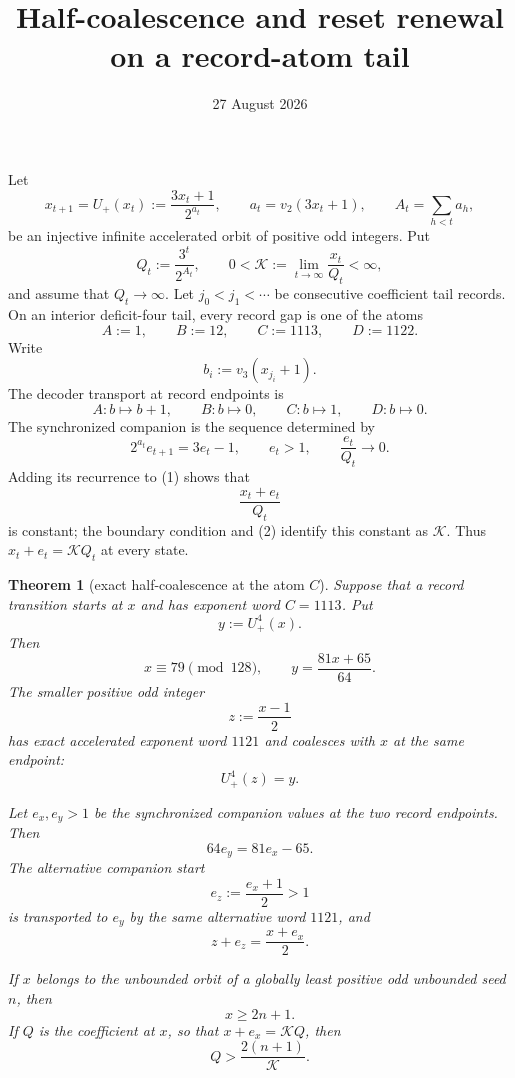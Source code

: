 \documentclass[11pt]{article}
\title{Half-coalescence and reset renewal on a record-atom tail}
\author{}
\date{27 August 2026}
\newtheorem{theorem}{Theorem}
\newcommand{\Up}{U_+}
\begin{document}
\maketitle

Let
\[
 x_{t+1}=\Up(x_t):=\frac{3x_t+1}{2^{a_t}},
 \qquad
 a_t=v_2(3x_t+1),
 \qquad
 A_t=\sum_{h<t}a_h,
 \tag{1}
\]
be an injective infinite accelerated orbit of positive odd integers.  Put
\[
 Q_t:=\frac{3^t}{2^{A_t}},
 \qquad
 0<\mathcal K:=\lim_{t\to\infty}\frac{x_t}{Q_t}<\infty,
 \tag{2}
\]
and assume that $Q_t\to\infty$.  Let $j_0<j_1<\cdots$ be consecutive
coefficient tail records.  On an interior deficit-four tail, every record
gap is one of the atoms
\[
 A:=1,
 \qquad B:=12,
 \qquad C:=1113,
 \qquad D:=1122.
 \tag{3}
\]
Write
\[
 b_i:=v_3(x_{j_i}+1).
 \tag{4}
\]
The decoder transport at record endpoints is
\[
 A:b\mapsto b+1,
 \qquad B:b\mapsto0,
 \qquad C:b\mapsto1,
 \qquad D:b\mapsto0.
 \tag{5}
\]
The synchronized companion is the sequence determined by
\[
 2^{a_t}e_{t+1}=3e_t-1,
 \qquad e_t>1,
 \qquad \frac{e_t}{Q_t}\longrightarrow0.
\]
Adding its recurrence to (1) shows that
\[
 \frac{x_t+e_t}{Q_t}
\]
is constant; the boundary condition and (2) identify this constant as
$\mathcal K$.  Thus $x_t+e_t=\mathcal KQ_t$ at every state.

\begin{theorem}[exact half-coalescence at the atom $C$]
Suppose that a record transition starts at $x$ and has exponent word
$C=1113$.  Put
\[
 y:=\Up^4(x).
 \tag{6}
\]
Then
\[
 x\equiv79\pmod {128},
 \qquad
 y=\frac{81x+65}{64}.
 \tag{7}
\]
The smaller positive odd integer
\[
\boxed{z:=\frac{x-1}{2}}
\tag{8}
\]
has exact accelerated exponent word $1121$ and coalesces with $x$ at the
same endpoint:
\[
\boxed{\Up^4(z)=y.}
\tag{9}
\]

Let $e_x,e_y>1$ be the synchronized companion values at the two record
endpoints.  Then
\[
 64e_y=81e_x-65.
 \tag{10}
\]
The alternative companion start
\[
 e_z:=\frac{e_x+1}{2}>1
 \tag{11}
\]
is transported to $e_y$ by the same alternative word $1121$, and
\[
\boxed{z+e_z=\frac{x+e_x}{2}.}
\tag{12}
\]

If $x$ belongs to the unbounded orbit of a globally least positive odd
unbounded seed $n$, then
\[
\boxed{x\geq2n+1.}
\tag{13}
\]
If $Q$ is the coefficient at $x$, so that $x+e_x=\mathcal KQ$, then
\[
\boxed{Q>\frac{2(n+1)}{\mathcal K}.}
\tag{14}
\]
\end{theorem}
\end{document}
